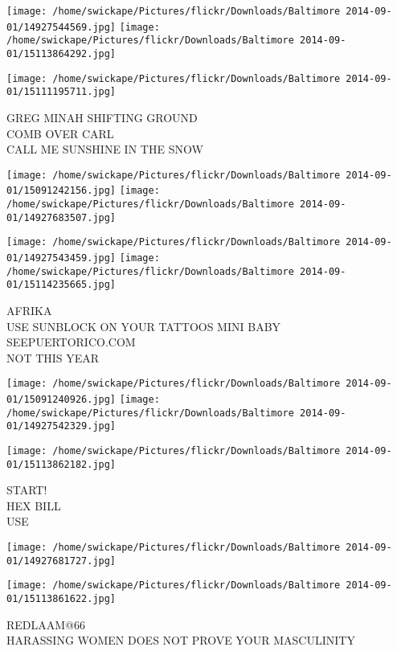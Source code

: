\documentclass[10pt,letterpaper]{article}
\begin{document}
\texttt{[image: /home/swickape/Pictures/flickr/Downloads/Baltimore 2014-09-01/14927544569.jpg]}
\texttt{[image: /home/swickape/Pictures/flickr/Downloads/Baltimore 2014-09-01/15113864292.jpg]}

\vspace{0.25in}
\texttt{[image: /home/swickape/Pictures/flickr/Downloads/Baltimore 2014-09-01/15111195711.jpg]}

GREG MINAH SHIFTING GROUND\\
COMB OVER CARL\\
CALL ME SUNSHINE IN THE SNOW\\
\pagebreak

\texttt{[image: /home/swickape/Pictures/flickr/Downloads/Baltimore 2014-09-01/15091242156.jpg]}
\texttt{[image: /home/swickape/Pictures/flickr/Downloads/Baltimore 2014-09-01/14927683507.jpg]}

\texttt{[image: /home/swickape/Pictures/flickr/Downloads/Baltimore 2014-09-01/14927543459.jpg]}
\texttt{[image: /home/swickape/Pictures/flickr/Downloads/Baltimore 2014-09-01/15114235665.jpg]}

AFRIKA\\
USE SUNBLOCK ON YOUR TATTOOS MINI BABY\\
SEEPUERTORICO.COM\\
NOT THIS YEAR\\
\pagebreak

\texttt{[image: /home/swickape/Pictures/flickr/Downloads/Baltimore 2014-09-01/15091240926.jpg]}
\texttt{[image: /home/swickape/Pictures/flickr/Downloads/Baltimore 2014-09-01/14927542329.jpg]}

\vspace{0.25in}
\texttt{[image: /home/swickape/Pictures/flickr/Downloads/Baltimore 2014-09-01/15113862182.jpg]}

START!\\
HEX BILL\\
USE\\
\pagebreak

\texttt{[image: /home/swickape/Pictures/flickr/Downloads/Baltimore 2014-09-01/14927681727.jpg]}

\vspace{0.25in}
\texttt{[image: /home/swickape/Pictures/flickr/Downloads/Baltimore 2014-09-01/15113861622.jpg]}

REDLAAM@66\\
HARASSING WOMEN DOES NOT PROVE YOUR MASCULINITY\\
\pagebreak
\end{document}
